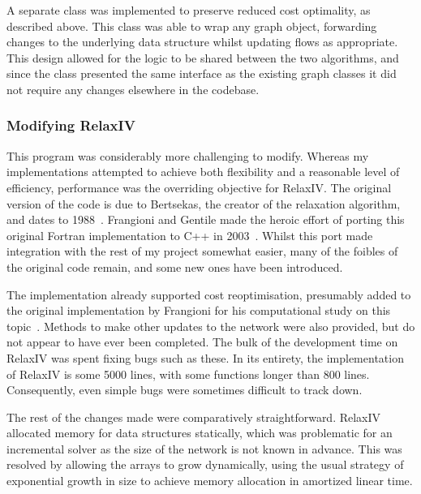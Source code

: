 A separate class was implemented to preserve reduced cost optimality, as described above. This class was able to wrap any graph object, forwarding changes to the underlying data structure whilst updating flows as appropriate. This design allowed for the logic to be shared between the two algorithms, and since the class presented the same interface as the existing graph classes it did not require any changes elsewhere in the codebase.

\subsubsection{Modifying RelaxIV}
This program was considerably more challenging to modify. Whereas my implementations attempted to achieve both flexibility and a reasonable level of efficiency, performance was the overriding objective for RelaxIV. The original version of the code is due to Bertsekas, the creator of the relaxation algorithm, and dates to 1988~\cite{BertsekasCodes:1988}. Frangioni and Gentile made the heroic effort of porting this original Fortran implementation to C++ in 2003~\cite{RelaxIV:2011}. Whilst this port made integration with the rest of my project somewhat easier, many of the foibles of the original code remain, and some new ones have been introduced.

The implementation already supported cost reoptimisation, presumably added to the original implementation by Frangioni for his computational study on this topic~\cite{Frangioni:2006}. Methods to make other updates to the network were also provided, but do not appear to have ever been completed. The bulk of the development time on RelaxIV was spent fixing bugs such as these. In its entirety, the implementation of RelaxIV is some 5000 lines, with some functions longer than 800 lines. Consequently, even simple bugs were sometimes difficult to track down\footnotemark.

The rest of the changes made were comparatively straightforward. RelaxIV allocated memory for data structures statically, which was problematic for an incremental solver as the size of the network is not known in advance. This was resolved by allowing the arrays to grow dynamically, using the usual strategy of exponential growth in size to achieve memory allocation in amortized linear time\footnotemark.

